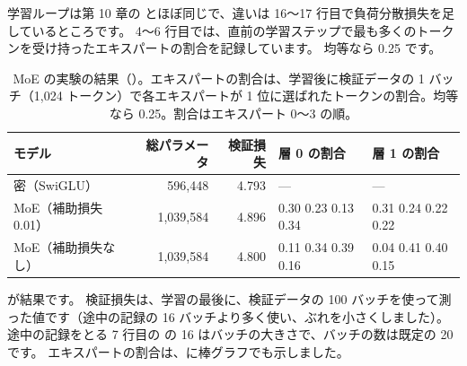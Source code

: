 
学習ループは第 10 章の  とほぼ同じで、違いは 16〜17 行目で負荷分散損失を足しているところです。
4〜6 行目では、直前の学習ステップで最も多くのトークンを受け持ったエキスパートの割合を記録しています。
均等なら 0.25 です。

\begin{table}[tbp]
\centering
\caption{MoE の実験の結果（）。エキスパートの割合は、学習後に検証データの 1 バッチ（1,024 トークン）で各エキスパートが 1 位に選ばれたトークンの割合。均等なら 0.25。割合はエキスパート 0〜3 の順。}
\label{tab:ma-moe}
\small
\begin{tabular}{@{}lrrll@{}}
\toprule
モデル & 総パラメータ & 検証損失 & 層 0 の割合 & 層 1 の割合 \\
\midrule
密（SwiGLU） & 596,448 & 4.793 & --- & --- \\
MoE（補助損失 0.01） & 1,039,584 & 4.896 & 0.30 0.23 0.13 0.34 & 0.31 0.24 0.22 0.22 \\
MoE（補助損失なし） & 1,039,584 & 4.800 & 0.11 0.34 0.39 0.16 & 0.04 0.41 0.40 0.15 \\
\bottomrule
\end{tabular}
\end{table}

が結果です。
検証損失は、学習の最後に、検証データの 100 バッチを使って測った値です（途中の記録の 16 バッチより多く使い、ぶれを小さくしました）。
途中の記録をとる 7 行目の  の 16 はバッチの大きさで、バッチの数は既定の 20 です。
エキスパートの割合は、に棒グラフでも示しました。


